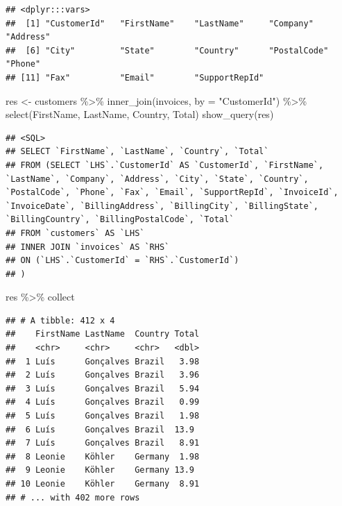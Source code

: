 \documentclass[
]{book}
\newenvironment{Shaded}{\begin{snugshade}}{\end{snugshade}}
\newcommand{\AttributeTok}[1]{\textcolor[rgb]{0.77,0.63,0.00}{#1}}
\newcommand{\FunctionTok}[1]{\textcolor[rgb]{0.00,0.00,0.00}{#1}}
\newcommand{\NormalTok}[1]{#1}
\newcommand{\OtherTok}[1]{\textcolor[rgb]{0.56,0.35,0.01}{#1}}
\newcommand{\SpecialCharTok}[1]{\textcolor[rgb]{0.00,0.00,0.00}{#1}}
\newcommand{\StringTok}[1]{\textcolor[rgb]{0.31,0.60,0.02}{#1}}
\theoremstyle{break}
\theoremstyle{nonumberplain}
\begin{document}
\begin{verbatim}
## <dplyr:::vars>
##  [1] "CustomerId"   "FirstName"    "LastName"     "Company"      "Address"     
##  [6] "City"         "State"        "Country"      "PostalCode"   "Phone"       
## [11] "Fax"          "Email"        "SupportRepId"
\end{verbatim}

\begin{Shaded}
\begin{Highlighting}[]
\NormalTok{res }\OtherTok{\textless{}{-}}\NormalTok{ customers }\SpecialCharTok{\%\textgreater{}\%} \FunctionTok{inner\_join}\NormalTok{(invoices, }\AttributeTok{by =} \StringTok{"CustomerId"}\NormalTok{) }\SpecialCharTok{\%\textgreater{}\%} \FunctionTok{select}\NormalTok{(FirstName, LastName, Country, Total) }
\FunctionTok{show\_query}\NormalTok{(res)}
\end{Highlighting}
\end{Shaded}

\begin{verbatim}
## <SQL>
## SELECT `FirstName`, `LastName`, `Country`, `Total`
## FROM (SELECT `LHS`.`CustomerId` AS `CustomerId`, `FirstName`, `LastName`, `Company`, `Address`, `City`, `State`, `Country`, `PostalCode`, `Phone`, `Fax`, `Email`, `SupportRepId`, `InvoiceId`, `InvoiceDate`, `BillingAddress`, `BillingCity`, `BillingState`, `BillingCountry`, `BillingPostalCode`, `Total`
## FROM `customers` AS `LHS`
## INNER JOIN `invoices` AS `RHS`
## ON (`LHS`.`CustomerId` = `RHS`.`CustomerId`)
## )
\end{verbatim}

\begin{Shaded}
\begin{Highlighting}[]
\NormalTok{res  }\SpecialCharTok{\%\textgreater{}\%}\NormalTok{ collect}
\end{Highlighting}
\end{Shaded}

\begin{verbatim}
## # A tibble: 412 x 4
##    FirstName LastName  Country Total
##    <chr>     <chr>     <chr>   <dbl>
##  1 Luís      Gonçalves Brazil   3.98
##  2 Luís      Gonçalves Brazil   3.96
##  3 Luís      Gonçalves Brazil   5.94
##  4 Luís      Gonçalves Brazil   0.99
##  5 Luís      Gonçalves Brazil   1.98
##  6 Luís      Gonçalves Brazil  13.9 
##  7 Luís      Gonçalves Brazil   8.91
##  8 Leonie    Köhler    Germany  1.98
##  9 Leonie    Köhler    Germany 13.9 
## 10 Leonie    Köhler    Germany  8.91
## # ... with 402 more rows
\end{verbatim}
\end{document}
